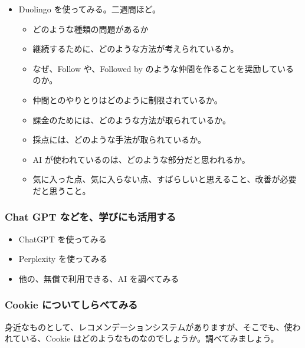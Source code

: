 \documentclass[
]{bxjsbook}
\providecommand{\tightlist}{%
  \setlength{\itemsep}{0pt}\setlength{\parskip}{0pt}}
\theoremstyle{definition}
\theoremstyle{definition}
\theoremstyle{definition}
\theoremstyle{definition}
\theoremstyle{remark}
\begin{document}
\begin{itemize}
\tightlist
\item
  Duolingo を使ってみる。二週間ほど。

  \begin{itemize}
  \tightlist
  \item
    どのような種類の問題があるか
  \item
    継続するために、どのような方法が考えられているか。
  \item
    なぜ、Follow や、Followed by のような仲間を作ることを奨励しているのか。
  \item
    仲間とのやりとりはどのように制限されているか。
  \item
    課金のためには、どのような方法が取られているか。
  \item
    採点には、どのような手法が取られているか。
  \item
    AI が使われているのは、どのような部分だと思われるか。
  \item
    気に入った点、気に入らない点、すばらしいと思えること、改善が必要だと思うこと。
  \end{itemize}
\end{itemize}

\hypertarget{chat-gpt-ux306aux3069ux3092ux5b66ux3073ux306bux3082ux6d3bux7528ux3059ux308b}{%
\subsubsection{Chat GPT などを、学びにも活用する}\label{chat-gpt-ux306aux3069ux3092ux5b66ux3073ux306bux3082ux6d3bux7528ux3059ux308b}}

\begin{itemize}
\tightlist
\item
  ChatGPT を使ってみる
\item
  Perplexity を使ってみる
\item
  他の、無償で利用できる、AI を調べてみる
\end{itemize}

\hypertarget{cookie-ux306bux3064ux3044ux3066ux3057ux3089ux3079ux3066ux307fux308b}{%
\subsubsection{Cookie についてしらべてみる}\label{cookie-ux306bux3064ux3044ux3066ux3057ux3089ux3079ux3066ux307fux308b}}

身近なものとして、レコメンデーションシステムがありますが、そこでも、使われている、Cookie はどのようなものなのでしょうか。調べてみましょう。
\end{document}
